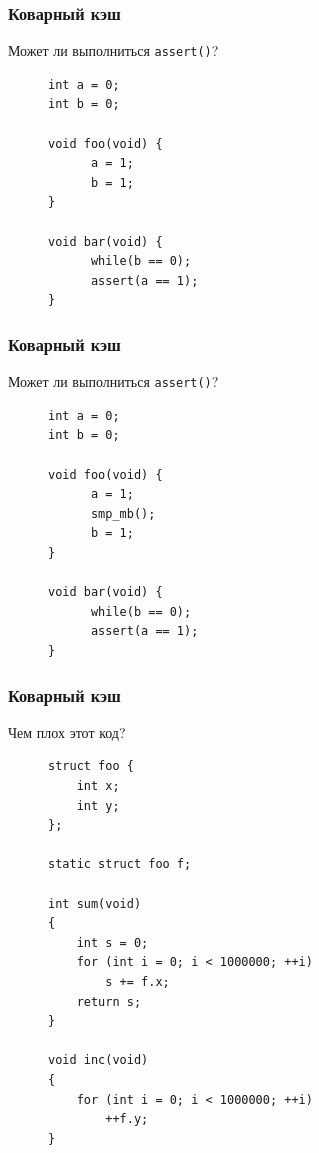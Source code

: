 \documentclass[aspectratio=169, pdf, 8pt, unicode]{beamer}
\begin{document}
\begin{frame}[fragile]
\frametitle{Коварный кэш}
Может ли выполниться \texttt{assert()}?
\begin{figure}[H]
\centering
\begin{BVerbatim}
int a = 0;
int b = 0;

void foo(void) {
      a = 1;
      b = 1;
}

void bar(void) {
      while(b == 0);
      assert(a == 1);
}
\end{BVerbatim}
\end{figure}
\end{frame}

\begin{frame}[fragile]
\frametitle{Коварный кэш}
Может ли выполниться \texttt{assert()}?
\begin{figure}[H]
\centering
\begin{BVerbatim}
int a = 0;
int b = 0;

void foo(void) {
      a = 1;
      smp_mb();
      b = 1;
}

void bar(void) {
      while(b == 0);
      assert(a == 1);
}
\end{BVerbatim}
\end{figure}
\end{frame}

\begin{frame}[fragile]
\frametitle{Коварный кэш}
Чем плох этот код?
\begin{figure}[H]
\centering
\begin{BVerbatim}
struct foo {
    int x;
    int y; 
};

static struct foo f;

int sum(void)
{
    int s = 0;
    for (int i = 0; i < 1000000; ++i)
        s += f.x;
    return s;
}

void inc(void)
{
    for (int i = 0; i < 1000000; ++i)
        ++f.y;
}
\end{BVerbatim}
\end{figure}
\end{frame}
\end{document}
